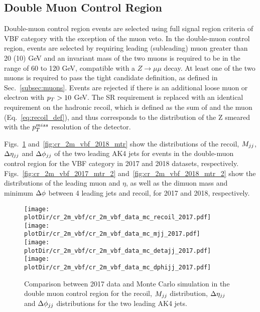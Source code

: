 \clearpage

\subsection{Double Muon Control Region}
\label{sec:selection_cr_2m}

Double-muon control region events are selected using full signal region criteria of VBF category with the exception of the muon veto. 
In the double-muon control region, events are selected by requiring leading (subleading) muon \pt greater than 20 (10) GeV and 
an invariant mass of the two muons is required to be in the range of 60 to 120 GeV, compatible with a $Z \rightarrow \mu \mu$ decay. 
At least one of the two muons is required to 
pass the tight candidate definition, as defined in Sec.~\ref{subsec:muons}. 
Events are rejected if there is an additional loose muon or electron with $p_T > 10$ GeV. 
The SR \ptmiss requirement is replaced with an identical requirement on the hadronic recoil, 
which is defined as the sum of \ptvecmiss 
and the muon \vpt (Eq.~\ref{eq:recoil_def}), and thus corresponds to the distribution of the Z \pt smeared
with the $p_T^{miss}$ resolution of the detector.

Figs.~\ref{fig:cr_2m_vbf_2017_mtr} and~\ref{fig:cr_2m_vbf_2018_mtr} show the distributions of the recoil, $M_{jj}$, $\Delta \eta_{jj}$ and  
$\Delta \phi_{jj}$ of the two leading AK4 jets for events in the double-muon control region for the VBF category 
in 2017 and 2018 datasets, respectively. Figs.~\ref{fig:cr_2m_vbf_2017_mtr_2} and~\ref{fig:cr_2m_vbf_2018_mtr_2} show the distributions 
of the leading muon \pt and $\eta$, as well as the dimuon mass and minimum $\Delta \phi$ between 4 leading jets and recoil, for 2017 and 2018, respectively.

\begin{figure}[htbp]
    \begin{center}
        \texttt{[image: \\plotDir/cr\_2m\_vbf/cr\_2m\_vbf\_data\_mc\_recoil\_2017.pdf]}
        \texttt{[image: \\plotDir/cr\_2m\_vbf/cr\_2m\_vbf\_data\_mc\_mjj\_2017.pdf]} \\
        \texttt{[image: \\plotDir/cr\_2m\_vbf/cr\_2m\_vbf\_data\_mc\_detajj\_2017.pdf]}
        \texttt{[image: \\plotDir/cr\_2m\_vbf/cr\_2m\_vbf\_data\_mc\_dphijj\_2017.pdf]}
    \end{center}
    \caption{Comparison between 2017 data and Monte Carlo simulation in the double muon control region for
        the recoil, $M_{jj}$ distribution, $\Delta \eta_{jj}$ and $\Delta \phi_{jj}$ distributions for the two leading AK4 jets.}
    \label{fig:cr_2m_vbf_2017_mtr}
\end{figure}

